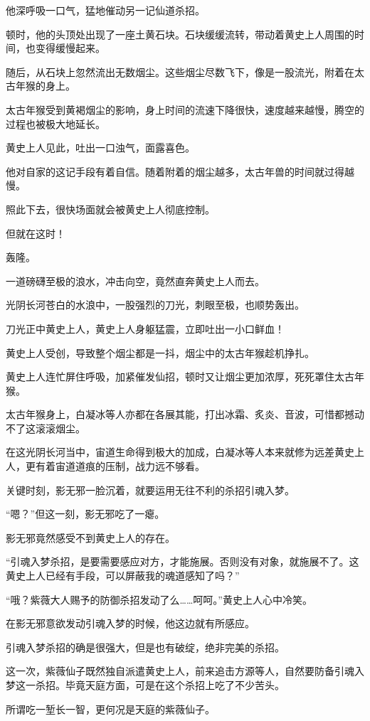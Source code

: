 \begin{this_body}
他深呼吸一口气，猛地催动另一记仙道杀招。

顿时，他的头顶处出现了一座土黄石块。石块缓缓流转，带动着黄史上人周围的时间，也变得缓慢起来。

随后，从石块上忽然流出无数烟尘。这些烟尘尽数飞下，像是一股流光，附着在太古年猴的身上。

太古年猴受到黄褐烟尘的影响，身上时间的流速下降很快，速度越来越慢，腾空的过程也被极大地延长。

黄史上人见此，吐出一口浊气，面露喜色。

他对自家的这记手段有着自信。随着附着的烟尘越多，太古年兽的时间就过得越慢。

照此下去，很快场面就会被黄史上人彻底控制。

但就在这时！

轰隆。

一道磅礴至极的浪水，冲击向空，竟然直奔黄史上人而去。

光阴长河苍白的水浪中，一股强烈的刀光，刺眼至极，也顺势轰出。

刀光正中黄史上人，黄史上人身躯猛震，立即吐出一小口鲜血！

黄史上人受创，导致整个烟尘都是一抖，烟尘中的太古年猴趁机挣扎。

黄史上人连忙屏住呼吸，加紧催发仙招，顿时又让烟尘更加浓厚，死死罩住太古年猴。

太古年猴身上，白凝冰等人亦都在各展其能，打出冰霜、炙炎、音波，可惜都撼动不了这滚滚烟尘。

在这光阴长河当中，宙道生命得到极大的加成，白凝冰等人本来就修为远差黄史上人，更有着宙道道痕的压制，战力远不够看。

关键时刻，影无邪一脸沉着，就要运用无往不利的杀招引魂入梦。

“嗯？”但这一刻，影无邪吃了一瘪。

影无邪竟然感受不到黄史上人的存在。

“引魂入梦杀招，是要需要感应对方，才能施展。否则没有对象，就施展不了。这黄史上人已经有手段，可以屏蔽我的魂道感知了吗？”

“哦？紫薇大人赐予的防御杀招发动了么……呵呵。”黄史上人心中冷笑。

在影无邪意欲发动引魂入梦的时候，他这边就有所感应。

引魂入梦杀招的确是很强大，但是也有破绽，绝非完美的杀招。

这一次，紫薇仙子既然独自派遣黄史上人，前来追击方源等人，自然要防备引魂入梦这一杀招。毕竟天庭方面，可是在这个杀招上吃了不少苦头。

所谓吃一堑长一智，更何况是天庭的紫薇仙子。


\end{this_body}
